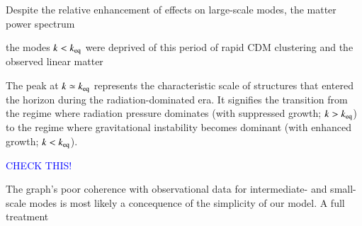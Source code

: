 Despite the relative enhancement of effects on large-scale modes, the matter power spectrum 

the modes $k<k_\mathrm{eq}$ were deprived of this period of rapid CDM clustering and the observed linear matter 


The peak at $k\simeq k_\mathrm{eq}$ represents the characteristic scale of structures that entered the horizon during the radiation-dominated era. It signifies the transition from the regime where radiation pressure dominates (with suppressed growth; $k>k_\mathrm{eq}$) to the regime where gravitational instability becomes dominant (with enhanced growth; $k<k_\mathrm{eq}$). 

\textcolor{blue}{CHECK THIS!} 



The graph's poor coherence with observational data for intermediate- and small-scale modes is most likely a concequence of the simplicity of our model. A full treatment 


